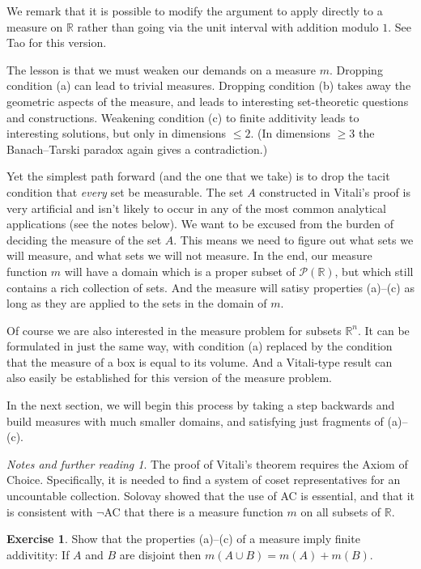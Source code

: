 \documentclass[11pt,oneside]{amsbook}
\newcommand{\RR}{{\mathbb R}}
\theoremstyle{definition}
\newtheorem{exerc}{Exercise}[section]
\theoremstyle{plain}
\theoremstyle{definition}
\theoremstyle{remark}
\newtheorem*{notes}{Notes and further reading}
\numberwithin{equation}{section}
\numberwithin{figure}{section}
\begin{document}
We remark that it is possible to modify the argument to apply directly to a measure on $\RR$ rather than going via the unit interval with addition modulo $1$. See Tao for this version.

The lesson is that we must weaken our demands on a measure $m$. Dropping condition (a) can lead to trivial measures. Dropping condition (b) takes away the geometric aspects of the measure, and leads to interesting set-theoretic questions and constructions. Weakening condition (c) to finite additivity leads to interesting solutions, but only in dimensions $\leq2$. (In dimensions $\geq3$ the Banach--Tarski paradox again gives a contradiction.)

Yet the simplest path forward (and the one that we take) is to drop the tacit condition that \emph{every} set be measurable. The set $A$ constructed in Vitali's proof is very artificial and isn't likely to occur in any of the most common analytical applications (see the notes below). We want to be excused from the burden of deciding the measure of the set $A$. This means we need to figure out what sets we will measure, and what sets we will not measure. In the end, our measure function $m$ will have a domain which is a proper subset of $\mathcal P(\RR)$, but which still contains a rich collection of sets. And the measure will satisy properties (a)--(c) as long as they are applied to the sets in the domain of $m$.

Of course we are also interested in the measure problem for subsets $\RR^n$. It can be formulated in just the same way, with condition (a) replaced by the condition that the measure of a box is equal to its volume. And a Vitali-type result can also easily be established for this version of the measure problem.

In the next section, we will begin this process by taking a step backwards and build measures with much smaller domains, and satisfying just fragments of (a)--(c).

\begin{notes}
  The proof of Vitali's theorem requires the Axiom of Choice. Specifically, it is needed to find a system of coset representatives for an uncountable collection. Solovay showed that the use of AC is essential, and that it is consistent with $\neg$AC that there is a measure function $m$ on all subsets of $\RR$.
\end{notes}

\begin{exerc}
  Show that the properties (a)--(c) of a measure imply finite addivitity: If $A$ and $B$ are disjoint then $m(A\cup B)=m(A)+m(B)$.
\end{exerc}
\end{document}
